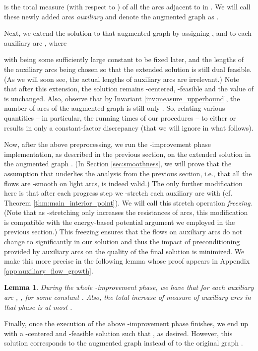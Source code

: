 \documentclass[11pt, letterpaper]{article}
\newtheorem{lemma}[theorem]{Lemma}
\begin{document}
is the total measure (with respect to ) of all the arcs adjacent to  in . We will call these newly added arcs {\em auxiliary} and denote the augmented graph as . 

Next, we extend the solution  to that augmented graph  by assigning ,  and  to each auxiliary arc , where

with  being some sufficiently large constant to be fixed later, and the lengths of the auxiliary arcs being chosen so that the extended solution is still dual feasible. (As we will soon see, the actual lengths of auxiliary arcs are irrelevant.) Note that after this extension, the solution  remains -centered, -feasible and the value of  is unchanged. Also, observe that by Invariant \ref{inv:measure_upperbound}, the number  of arcs of the augmented graph  is still only . So, relating various quantities -- in particular, the running times of our procedures -- to either  or  results in only a constant-factor discrepancy (that we will ignore in what follows).

Now, after the above preprocessing, we run the -improvement phase implementation, as described in the previous section, on the extended solution in the augmented graph . (In Section \ref{sec:smoothness}, we will prove that the assumption that underlies the analysis from the previous section, i.e., that all the flows  are -smooth on light arcs, is indeed valid.) The only further modification here is that after each progress step we -stretch each auxiliary arc  with  (cf. Theorem \ref{thm:main_interior_point}). We will call this stretch operation {\em freezing}. (Note that as -stretching only increases the resistances of arcs, this modification is compatible with the energy-based potential argument we employed in the previous section.) This freezing ensures that the flows on auxiliary arcs do not change to significantly in our solution and thus the impact of preconditioning provided by auxiliary arcs on the quality of the final solution is minimized. We make this more precise in the following lemma whose proof appears in Appendix \ref{app:auxiliary_flow_growth}.

\begin{lemma}
\label{lem:auxiliary_flow_growth}
During the whole -improvement phase, we have that for each auxiliary arc , , for some constant . Also, the total increase of measure of auxiliary arcs in that phase is at most .
\end{lemma}



Finally, once the execution of the above -improvement phase finishes, we end up with a -centered and -feasible solution  such that , as desired. However, this solution corresponds to the augmented graph  instead of to the original graph . 
\end{document}
